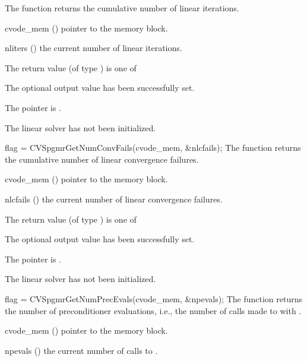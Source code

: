 {
  The function  returns the
  cumulative number of linear iterations.
}
{
  \begin{args}
  \item[cvode\_mem] ()
    pointer to the {\cvode} memory block.
  \item[nliters] ()
    the current number of linear iterations.
  \end{args}
}
{
  The return value  (of type ) is one of
  \begin{args}
  \item[\Id{CVSPGMR\_SUCCESS}] 
    The optional output value has been successfully set.
  \item[\Id{CVSPGMR\_MEM\_NULL}]
    The  pointer is .
  \item[\Id{CVSPGMR\_LMEM\_NULL}]
    The {\cvspgmr} linear solver has not been initialized.
  \end{args}
}
{}
{
  flag = CVSpgmrGetNumConvFails(cvode\_mem, \&nlcfails);
}
{
  The function  returns the
  cumulative number of linear convergence failures.
}
{
  \begin{args}
  \item[cvode\_mem] ()
    pointer to the {\cvode} memory block.
  \item[nlcfails] ()
    the current number of linear convergence failures.
  \end{args}
}
{
  The return value  (of type ) is one of
  \begin{args}
  \item[\Id{CVSPGMR\_SUCCESS}] 
    The optional output value has been successfully set.
  \item[\Id{CVSPGMR\_MEM\_NULL}]
    The  pointer is .
  \item[\Id{CVSPGMR\_LMEM\_NULL}]
    The {\cvspgmr} linear solver has not been initialized.
  \end{args}
}
{}
{
  flag = CVSpgmrGetNumPrecEvals(cvode\_mem, \&npevals);
}
{
  The function  returns the
  number of preconditioner evaluations, i.e., the number of 
  calls made to  with .
}
{
  \begin{args}
  \item[cvode\_mem] ()
    pointer to the {\cvode} memory block.
  \item[npevals] ()
    the current number of calls to .
  \end{args}
}
